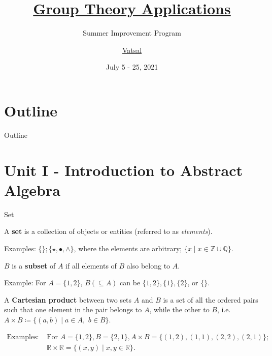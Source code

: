 \documentclass{beamer}
\title{\href{https://vatsal1005.github.io/Group-Theory-Applications/main.html}{Group Theory Applications}}
\subtitle{Summer Improvement Program}
\author{\href{https://sites.google.com/iitb.ac.in/vatsal/}{Vatsal}}
\institute[IIT Bombay]{\href{https://www.chem.iitb.ac.in/}{Department of Chemistry} \\
\href{https://www.iitb.ac.in/}{Indian Institute of Technology Bombay}}
\date{July 5 - 25, 2021}
\newcommand\boldtext[1]{\textcolor{bolds}{\textbf{#1}}}
\newcommand\italictext[1]{\textcolor{italics}{\textit{#1}}}
\begin{document}
\begin{frame}
\titlepage
\end{frame}

\section*{Outline}
\begin{frame}{Outline}
    \tableofcontents
\end{frame}

\section{Unit I - Introduction to Abstract Algebra}

\begin{frame}{Set}
    \begin{definition}
        A \boldtext{set} is a collection of objects or entities (referred to as \italictext{elements}).
    \end{definition}
    Examples: $\{\}; \{\star,\bullet,\wedge\}$, where the elements are arbitrary; $\{x \mid x \in \mathbb{Z}\cup\mathbb{Q}\}$. 
    \begin{definition}
        $B$ is a \boldtext{subset} of $A$ if all elements of $B$ also belong to $A$.
    \end{definition}
    Example: For $A=\{1,2\}$, $B (\subseteq A)$ can be $\{1,2\},\{1\},\{2\}$, or $\{\}$.
    \begin{definition}
        A \boldtext{Cartesian product} between two sets $A$ and $B$ is a set of all the ordered pairs such that one element in the pair belongs to $A$, while the other to $B$, i.e. $A\times B\coloneqq\{(a,b)\mid a\in A,$ $b\in B\}$.
    \end{definition}
    \begin{align*}
        \text{Examples: } & \text{For $A=\{1,2\},B=\{2,1\},A\times B=\{(1,2),(1,1),(2,2),(2,1)\}$;}\\ & \text{$\mathbb{R}\times\mathbb{R}=\{(x,y)\mid x,y\in\mathbb{R}\}$}.
    \end{align*}
\end{frame}
\end{document}
